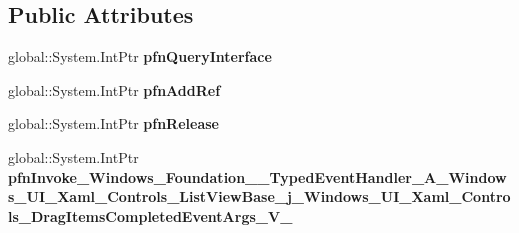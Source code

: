 \subsection*{Public Attributes}
\begin{DoxyCompactItemize}
\item 
\mbox{\label{struct_windows_1_1_foundation_1_1_typed_event_handler___a___windows___u_i___xaml___controls___li15051749ac89515b728f66d306810c20_af9c32620f9bd98b589a3ef3a7cf09fe1}} 
global\+::\+System.\+Int\+Ptr {\bfseries pfn\+Query\+Interface}
\item 
\mbox{\label{struct_windows_1_1_foundation_1_1_typed_event_handler___a___windows___u_i___xaml___controls___li15051749ac89515b728f66d306810c20_acdbe5034cd0bd343a28cacf588972a4e}} 
global\+::\+System.\+Int\+Ptr {\bfseries pfn\+Add\+Ref}
\item 
\mbox{\label{struct_windows_1_1_foundation_1_1_typed_event_handler___a___windows___u_i___xaml___controls___li15051749ac89515b728f66d306810c20_a6c7ebb552f60dcd0c5fbae8fad2f3b21}} 
global\+::\+System.\+Int\+Ptr {\bfseries pfn\+Release}
\item 
\mbox{\label{struct_windows_1_1_foundation_1_1_typed_event_handler___a___windows___u_i___xaml___controls___li15051749ac89515b728f66d306810c20_ad0b5d0e5017d2ab2e895e5fa8d9afc03}} 
global\+::\+System.\+Int\+Ptr {\bfseries pfn\+Invoke\+\_\+\+Windows\+\_\+\+Foundation\+\_\+\+\_\+\+Typed\+Event\+Handler\+\_\+\+A\+\_\+\+Windows\+\_\+\+U\+I\+\_\+\+Xaml\+\_\+\+Controls\+\_\+\+List\+View\+Base\+\_\+j\+\_\+\+Windows\+\_\+\+U\+I\+\_\+\+Xaml\+\_\+\+Controls\+\_\+\+Drag\+Items\+Completed\+Event\+Args\+\_\+\+V\+\_\+}
\end{DoxyCompactItemize}
